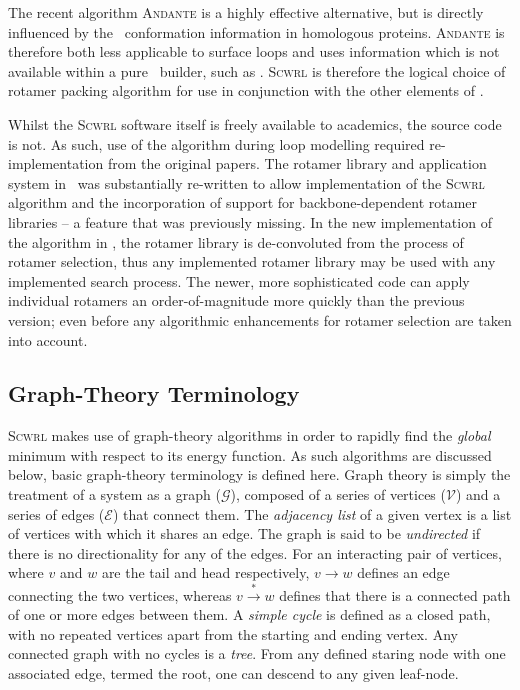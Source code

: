 The recent algorithm  \textsc{Andante}\cite{METHOD:ANDANTE} is a highly effective alternative, but is directly influenced by the \sidechain\ conformation information in homologous proteins. \textsc{Andante} is therefore both less applicable to surface loops and uses information which is  not available within a pure \abinitio\ builder, such as \arcus. \textsc{Scwrl} is therefore the logical choice of rotamer packing algorithm for use in conjunction with the other elements of \arcus.

Whilst the \textsc{Scwrl} software itself is freely available to academics, the source code is not. As such, use of the algorithm during loop modelling required re-implementation from the original papers. The rotamer library and application system in \pd\ was substantially re-written to allow implementation of the \textsc{Scwrl} algorithm and the incorporation of support for backbone-dependent rotamer libraries -- a feature that was previously missing. In the new implementation of the algorithm in \pd, the rotamer library is de-convoluted from the process of rotamer selection, thus any implemented rotamer library may be used with any implemented search process. The newer, more sophisticated code can apply individual rotamers an order-of-magnitude more quickly than the previous version; even before any algorithmic enhancements for rotamer selection are taken into account.



\subsection{Graph-Theory Terminology}

\textsc{Scwrl} makes use of graph-theory algorithms in order to rapidly find the \emph{global} minimum with respect to its energy function. As such algorithms are discussed below, basic graph-theory terminology is defined here. Graph theory is simply the treatment of a system as a graph ($\mathcal{G}$), composed of a series of vertices ($\mathcal{V}$)
and a series of edges ($\mathcal{E}$) that connect them. The \emph{adjacency list}
of a given vertex is a list of vertices with which it shares an edge.
The graph is said to be \emph{undirected} if there is no directionality for any of the edges.
For an interacting pair of vertices, where $v$ and $w$ are the tail and head respectively, $v \rightarrow w$ defines an edge connecting the two vertices, whereas $v \overset{*}{\rightarrow} w$ defines that there is a connected path of one or more edges between them.
A \emph{simple cycle} is defined as a closed path, with no repeated vertices apart from the starting and ending vertex. Any connected graph with no cycles is a \emph{tree}.
From any defined staring node with one associated edge, termed the root, one can descend 
to any given leaf-node.

